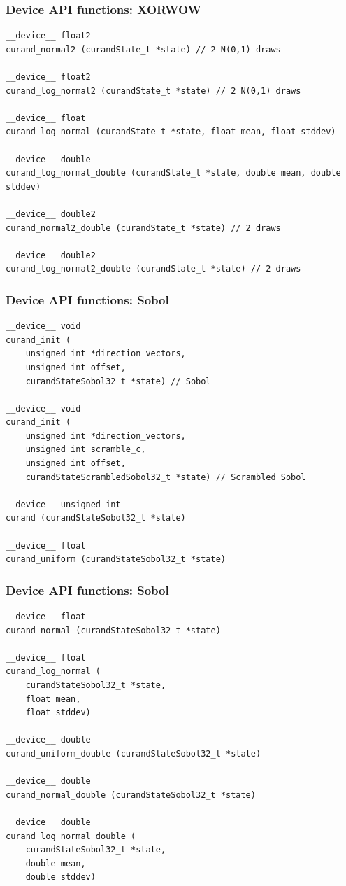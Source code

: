 \documentclass[handout]{beamer}
\numberwithin{equation}{section}
\begin{document}
\begin{frame}[fragile]
\frametitle{Device API functions: XORWOW}
\lstset{basicstyle=\tiny}
\begin{lstlisting}
__device__ float2
curand_normal2 (curandState_t *state) // 2 N(0,1) draws

__device__ float2
curand_log_normal2 (curandState_t *state) // 2 N(0,1) draws

__device__ float
curand_log_normal (curandState_t *state, float mean, float stddev)

__device__ double
curand_log_normal_double (curandState_t *state, double mean, double stddev)

__device__ double2
curand_normal2_double (curandState_t *state) // 2 draws

__device__ double2
curand_log_normal2_double (curandState_t *state) // 2 draws
\end{lstlisting}
\end{frame}






\begin{frame}[fragile]
\frametitle{Device API functions: Sobol}

\lstset{basicstyle=\tiny}
\begin{lstlisting}
__device__ void
curand_init (
    unsigned int *direction_vectors,
    unsigned int offset,
    curandStateSobol32_t *state) // Sobol 

__device__ void
curand_init (
    unsigned int *direction_vectors,
    unsigned int scramble_c,
    unsigned int offset,
    curandStateScrambledSobol32_t *state) // Scrambled Sobol
    
__device__ unsigned int
curand (curandStateSobol32_t *state)

__device__ float
curand_uniform (curandStateSobol32_t *state)
\end{lstlisting}
\end{frame}

\begin{frame}[fragile]
\frametitle{Device API functions: Sobol}
\lstset{basicstyle=\tiny}
\begin{lstlisting}
__device__ float
curand_normal (curandStateSobol32_t *state)

__device__ float
curand_log_normal (
    curandStateSobol32_t *state,
    float mean,
    float stddev)

__device__ double
curand_uniform_double (curandStateSobol32_t *state)

__device__ double
curand_normal_double (curandStateSobol32_t *state)

__device__ double
curand_log_normal_double (
    curandStateSobol32_t *state,
    double mean,
    double stddev)

\end{lstlisting}
\end{frame}
\end{document}
